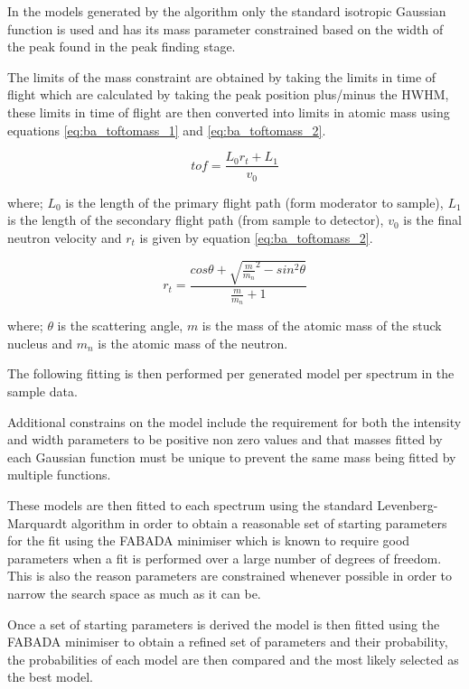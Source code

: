 \documentclass[a4paper]{article}
\begin{document}
In the models generated by the algorithm only the standard isotropic Gaussian
function is used and has its mass parameter constrained based on the width of
the peak found in the peak finding stage.

The limits of the mass constraint are obtained by taking the limits in time of
flight which are calculated by taking the peak position plus/minus the
\gls*{HWHM}, these limits in time of flight are then converted into limits in
atomic mass using equations \ref{eq:ba_toftomass_1} and \ref{eq:ba_toftomass_2}.

\begin{equation}
  \label{eq:ba_toftomass_1}
  tof = \frac{L_{0}r_{t} + L_{1}}{v_{0}}
\end{equation}

where; $L_{0}$ is the length of the primary flight path (form moderator to
sample), $L_{1}$ is the length of the secondary flight path (from sample to
detector), $v_{0}$ is the final neutron velocity and $r_{t}$ is given by
equation \ref{eq:ba_toftomass_2}.

\begin{equation}
  \label{eq:ba_toftomass_2}
  r_{t} =
    \frac{cos\theta + \sqrt{\frac{m}{m_{n}}^{2}-sin^{2}\theta}}
         {\frac{m}{m_{n}} + 1}
\end{equation}

where; $\theta$ is the scattering angle, $m$ is the mass of the atomic mass of
the stuck nucleus and $m_{n}$ is the atomic mass of the neutron.

The following fitting is then performed per generated model per spectrum in the
sample data.

Additional constrains on the model include the requirement for both the
intensity and width parameters to be positive non zero values and that masses
fitted by each Gaussian function must be unique to prevent the same mass being
fitted by multiple functions.

These models are then fitted to each spectrum using the standard
Levenberg-Marquardt algorithm in order to obtain a reasonable set of starting
parameters for the fit using the \gls*{FABADA} minimiser which is known to
require good parameters when a fit is performed over a large number of degrees
of freedom. This is also the reason parameters are constrained whenever possible
in order to narrow the search space as much as it can be.

Once a set of starting parameters is derived the model is then fitted using the
\gls*{FABADA} minimiser to obtain a refined set of parameters and their
probability, the probabilities of each model are then compared and the most
likely selected as the best model.
\end{document}
